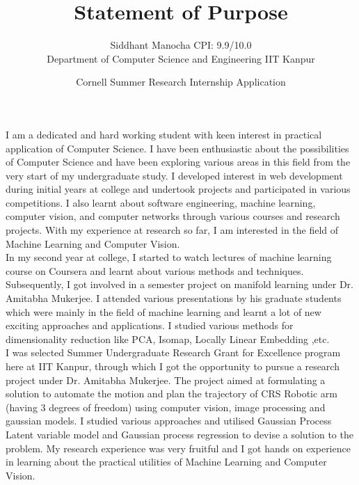 \documentclass{article}
\title{Statement of Purpose}
\author{Siddhant Manocha \hfill CPI: 9.9/10.0  \\ Department of Computer Science and Engineering \hfill IIT Kanpur  }
\date{Cornell Summer Research Internship Application}
\begin{document}
  \maketitle%
  \vspace{0.5cm}
I am a dedicated and hard working student with keen interest in practical application of Computer Science. I have been enthusiastic about the possibilities of Computer Science and have been  exploring various areas in this field from the very start of my undergraduate study. I developed interest in web development during initial years at college and undertook projects and participated in various competitions. I also learnt about software engineering, machine learning, computer vision, and computer networks through various courses and research projects. With my experience at research so far, I am interested in the field of Machine Learning and Computer Vision. \\

In my second year at college, I started to watch lectures of machine learning course on Coursera and learnt about various methods and techniques. Subsequently, I got involved in a semester project on manifold learning under Dr. Amitabha Mukerjee. I attended various presentations by his graduate students which were mainly in the field of machine learning and learnt a lot of new exciting approaches and applications. I studied various methods for dimensionality reduction like PCA, Isomap, Locally Linear Embedding ,etc. \\

I was selected Summer Undergraduate Research Grant for Excellence program here at IIT Kanpur, through which I got the opportunity to pursue a research project under Dr. Amitabha Mukerjee. The project aimed at formulating a solution to automate the motion and plan the trajectory of CRS Robotic arm (having 3 degrees of freedom) using computer vision, image processing and gaussian models. I studied various approaches and utilised Gaussian Process Latent variable model and Gaussian process regression to devise a solution to the problem. My research experience was very fruitful and I got hands on experience in learning about the practical utilities of Machine Learning and Computer Vision. \\
\end{document}
